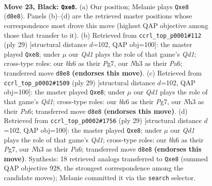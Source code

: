 \documentclass[11pt]{article}
\begin{document}
\clearpage

\begin{figure}[p]\centering
\begin{subfigure}{0.46\textwidth}\centering
\resizebox{\linewidth}{!}{%
\newchessgame
\chessboard[
  setfen={r1bqR1k1/ppb4p/5ppB/3p4/7P/1B1P1NPn/PPP2PK1/R2Q4 b - - 0 23},
  showmover=false,
  pgfstyle=straightmove, color=movearrow, markmove={d8-e8}
]}
\caption{}
\end{subfigure}\hfill
\begin{subfigure}{0.46\textwidth}\centering
\resizebox{\linewidth}{!}{%
\newchessgame
\chessboard[
  setfen={r2qR1k1/5ppp/p1pb4/1p1n1b2/8/1BPP1Q2/PP3PPP/RNB3K1 b - - 0 15},
  showmover=false,
  pgfstyle=straightmove, color=movearrow, markmove={d8-e8}
]}
\caption{}
\end{subfigure}
\\[4pt]
\begin{subfigure}{0.46\textwidth}\centering
\resizebox{\linewidth}{!}{%
\newchessgame
\chessboard[
  setfen={r2qR1k1/5ppp/p1pb4/1p1n1b2/8/1BPP1Q2/PP3PPP/RNB3K1 b - - 0 15},
  showmover=false,
  pgfstyle=straightmove, color=movearrow, markmove={d8-e8}
]}
\caption{}
\end{subfigure}\hfill
\begin{subfigure}{0.46\textwidth}\centering
\resizebox{\linewidth}{!}{%
\newchessgame
\chessboard[
  setfen={r2qR1k1/5ppp/p1pb4/1p1n1b2/8/1BPP1Q2/PP3PPP/RNB3K1 b - - 0 15},
  showmover=false,
  pgfstyle=straightmove, color=movearrow, markmove={d8-e8}
]}
\caption{}
\end{subfigure}
\caption{\textbf{Move 23, Black: \texttt{Qxe8}.} (a) Our position; Melanie plays \texttt{Qxe8} (\texttt{d8e8}). Panels (b)--(d) are the retrieved master positions whose correspondence most drove this move (highest QAP objective among those that transfer to it). (b) Retrieved from \texttt{ccrl\_top\_p0001\#112} (ply 29) [structural distance $d$=102, QAP obj=100]: the master played \texttt{Qxe8}; under $\mu$ our \emph{Qd1} plays the role of that game's \emph{Qd1}; cross-type roles: our \emph{b}h6 as their \emph{P}g7, our \emph{N}h3 as their \emph{P}a6; transferred move \texttt{d8e8} \textbf{(endorses this move)}. (c) Retrieved from \texttt{ccrl\_top\_p0002\#1509} (ply 29) [structural distance $d$=102, QAP obj=100]: the master played \texttt{Qxe8}; under $\mu$ our \emph{Qd1} plays the role of that game's \emph{Qd1}; cross-type roles: our \emph{b}h6 as their \emph{P}g7, our \emph{N}h3 as their \emph{P}a6; transferred move \texttt{d8e8} \textbf{(endorses this move)}. (d) Retrieved from \texttt{ccrl\_top\_p0002\#1756} (ply 29) [structural distance $d$=102, QAP obj=100]: the master played \texttt{Qxe8}; under $\mu$ our \emph{Qd1} plays the role of that game's \emph{Qd1}; cross-type roles: our \emph{b}h6 as their \emph{P}g7, our \emph{N}h3 as their \emph{P}a6; transferred move \texttt{d8e8} \textbf{(endorses this move)}. Synthesis: 18 retrieved analogs transferred to \texttt{Qxe8} (summed QAP objective 928, the strongest correspondence among the candidate moves); Melanie committed it via the \texttt{search} selector.}
\label{fig:thought-m45}
\end{figure}
\end{document}
